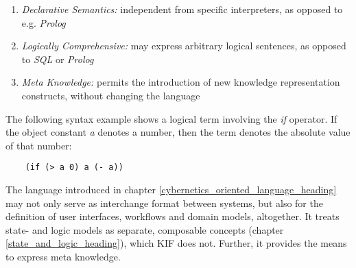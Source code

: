 \begin{enumerate}
    \item \emph{Declarative Semantics:} independent from specific interpreters,
        as opposed to e.g. \emph{Prolog}
    \item \emph{Logically Comprehensive:} may express arbitrary logical
        sentences, as opposed to \emph{SQL} or \emph{Prolog}
    \item \emph{Meta Knowledge:} permits the introduction of new knowledge
        representation constructs, without changing the language
\end{enumerate}

The following syntax example \cite{kif} shows a logical term involving the
\emph{if} operator. If the object constant \emph{a} denotes a number, then the
term denotes the absolute value of that number:

\begin{scriptsize}
    \begin{verbatim}
    (if (> a 0) a (- a))
    \end{verbatim}
\end{scriptsize}

The language introduced in chapter \ref{cybernetics_oriented_language_heading}
may not only serve as interchange format between systems, but also for the
definition of user interfaces, workflows and domain models, altogether. It
treats state- and logic models as separate, composable concepts (chapter
\ref{state_and_logic_heading}), which KIF does not. Further, it provides the
means to express meta knowledge.
